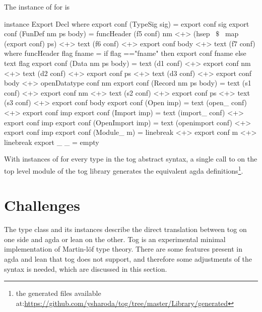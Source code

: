 The instance of  for  is 
\begin{hscode}
instance Export Decl where
  export conf (TypeSig sig) = export conf sig 
  export conf (FunDef nm ps body) =
    funcHeader (f5 conf) nm <+> (hsep ~$\$$~ map (export conf) ps) 
    <+> text (f6 conf) <+> export conf body <+> text (f7 conf)
    where funcHeader flag fname = 
            if flag =="fname" then export conf fname else text flag    
  export conf (Data nm ps body) =
    text (d1 conf) <+> export conf nm <+> text (d2 conf) 
    <+> export conf ps <+> text (d3 conf) <+> export conf body 
    <+> openDatatype conf nm
  export conf (Record nm ps body) =
    text (s1 conf) <+> export conf nm <+> text (s2 conf) 
    <+> export conf ps <+> text (s3 conf) <+> export conf body 
  export conf (Open imp) = text (open_ conf) <+> export conf imp
  export conf (Import imp) = text (import_ conf) <+> export conf imp
  export conf (OpenImport imp) = 
    text (openimport conf) <+> export conf imp
  export conf (Module_ m) =
    linebreak <+> export conf m  <+> linebreak 
  export _ _ = empty
\end{hscode}

With instances of  for every type in the tog abstract syntax, a single call to  on the top level module of the tog library generates the equivalent agda definitions\footnote{the generated files available at:\url{https://github.com/ysharoda/tog/tree/master/Library/generated}}.

\section{Challenges}
\label{sec:exporting:challenges}
The  type class and its instances describe the direct translation between tog on one side and agda or lean on the other. Tog is an experimental minimal implementation of Martin-l\"{o}f type theory. There are some features present in agda and lean that tog does not support, and therefore some adjustments of the syntax is needed, which are discussed in this section. 

